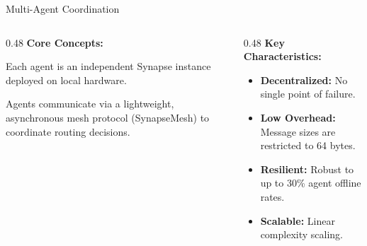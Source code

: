 \begin{frame}{Multi-Agent Coordination}
  \begin{columns}[T]
    \begin{column}{0.48\textwidth}
      \textbf{Core Concepts:}
      \vspace{0.2cm}
      
      Each agent is an independent Synapse instance deployed on local hardware. 
      
      Agents communicate via a lightweight, asynchronous mesh protocol (SynapseMesh) to coordinate routing decisions.
    \end{column}
    \begin{column}{0.48\textwidth}
      \textbf{Key Characteristics:}
      \begin{itemize}
        \item \textbf{Decentralized:} No single point of failure.
        \item \textbf{Low Overhead:} Message sizes are restricted to 64 bytes.
        \item \textbf{Resilient:} Robust to up to 30\% agent offline rates.
        \item \textbf{Scalable:} Linear complexity scaling.
      \end{itemize}
    \end{column}
  \end{columns}
\end{frame}

